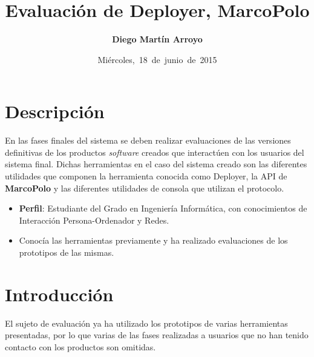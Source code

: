 
\usepackage{xcolor}
\hypersetup{
	colorlinks=true,
	urlcolor=blue,
	linkcolor=blue,
	citecolor=blue
}

\newcommand{\hmwkTitle}{Evaluación de Deployer, MarcoPolo } %
\newcommand{\hmwkDueDate}{Miércoles,\ 18\ de\ junio\ de\ 2015}
\newcommand{\hmwkClassInstructor}{Rodrigo Santamaría} %
\newcommand{\hmwkAuthorName}{Diego Martín Arroyo} %
\newcommand{\hmwkSubject}{3} %

\newcommand{\ordinalindicator}{\hspace{-1.5mm}$\phantom{a}^{\circ}$}
\title{\hmwkTitle}
\author{\textbf{\hmwkAuthorName}}
\date{\hmwkDueDate}


\maketitle

\tableofcontents

\section{Descripción}

En las fases finales del sistema se deben realizar evaluaciones de las versiones definitivas de los productos \textit{software} creados que interactúen con los usuarios del sistema final. Dichas herramientas en el caso del sistema creado son las diferentes utilidades que componen la herramienta conocida como Deployer, la API de \textbf{MarcoPolo} y las diferentes utilidades de consola que utilizan el protocolo.

\begin{itemize}
 	\item \textbf{Perfil}: Estudiante del Grado en Ingeniería Informática, con conocimientos de Interacción Persona-Ordenador y Redes.
 	\item Conocía las herramientas previamente y ha realizado evaluaciones de los prototipos de las mismas.
\end{itemize}

\section{Introducción}

El sujeto de evaluación ya ha utilizado los prototipos de varias herramientas presentadas, por lo que varias de las fases realizadas a usuarios que no han tenido contacto con los productos son omitidas.

